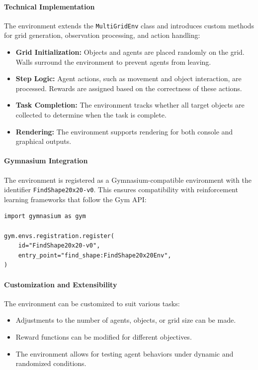 \documentclass[11pt]{article}
\begin{document}
\paragraph{Technical Implementation} 
The environment extends the \texttt{MultiGridEnv} class and introduces custom methods for grid generation, observation processing, and action handling:
\begin{itemize}
    \item \textbf{Grid Initialization:} Objects and agents are placed randomly on the grid. Walls surround the environment to prevent agents from leaving.
    \item \textbf{Step Logic:} Agent actions, such as movement and object interaction, are processed. Rewards are assigned based on the correctness of these actions.
    \item \textbf{Task Completion:} The environment tracks whether all target objects are collected to determine when the task is complete.
    \item \textbf{Rendering:} The environment supports rendering for both console and graphical outputs.
\end{itemize}

\paragraph{Gymnasium Integration} 
The environment is registered as a Gymnasium-compatible environment with the identifier \texttt{FindShape20x20-v0}. This ensures compatibility with reinforcement learning frameworks that follow the Gym API:
\begin{verbatim}
import gymnasium as gym

gym.envs.registration.register(
    id="FindShape20x20-v0",
    entry_point="find_shape:FindShape20x20Env",
)
\end{verbatim}

\paragraph{Customization and Extensibility}
The environment can be customized to suit various tasks:
\begin{itemize}
    \item Adjustments to the number of agents, objects, or grid size can be made.
    \item Reward functions can be modified for different objectives.
    \item The environment allows for testing agent behaviors under dynamic and randomized conditions.
\end{itemize}
\end{document}
